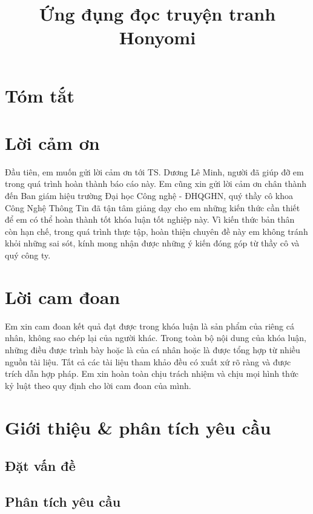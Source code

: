 \documentclass{report}
\title{Ứng đụng đọc truyện tranh Honyomi}
\begin{document}

\clearpage{}

\chapter*{Tóm tắt}

\chapter*{Lời cảm ơn}

Đầu tiên, em muốn gửi lời cảm ơn tới TS. Dương Lê Minh, người đã giúp đỡ em trong quá trình hoàn thành báo cáo này.
Em cũng xin gửi lời cảm ơn chân thành đến Ban giám hiệu trường Đại học Công nghệ - ĐHQGHN, quý thầy cô khoa Công Nghệ Thông Tin đã tận tâm giảng dạy cho em những kiến thức cần thiết để em có thể hoàn thành tốt khóa luận tốt nghiệp này.
Vì kiến thức bản thân còn hạn chế, trong quá trình thực tập, hoàn thiện chuyên đề này em không tránh khỏi những sai sót, kính mong nhận được những ý kiến đóng góp từ thầy cô và quý công ty.

\chapter*{Lời cam đoan}

Em xin cam đoan kết quả đạt được trong khóa luận là sản phẩm của riêng cá nhân, không sao chép lại của người khác. Trong toàn bộ nội dung của khóa luận, những điều được trình bày hoặc là của cá nhân hoặc là được tổng hợp từ nhiều nguồn tài liệu. Tất cả các tài liệu tham khảo đều có xuất xứ rõ ràng và được trích dẫn hợp pháp. Em xin hoàn toàn chịu trách nhiệm và chịu mọi hình thức kỷ luật theo quy định cho lời cam đoan của mình.

\tableofcontents{}
\clearpage{}

\listoffigures{}

\listoftables{}

\chapter{Giới thiệu \& phân tích yêu cầu}

\section{Đặt vấn đề}


\section{Phân tích yêu cầu}

\end{document}
